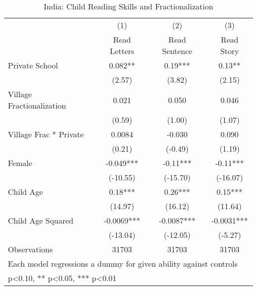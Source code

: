 \begin{table}[htbp]\centering
\def\sym#1{\ifmmode^{#1}\else\(^{#1}\)\fi}
\caption{India: Child Reading Skills and Fractionalization\label{indiareading}}
\begin{tabular}{l*{3}{c}}
\toprule
                &\multicolumn{1}{c}{(1)}&\multicolumn{1}{c}{(2)}&\multicolumn{1}{c}{(3)}\\
                &\multicolumn{1}{c}{Read Letters}&\multicolumn{1}{c}{Read Sentence}&\multicolumn{1}{c}{Read Story}\\
\midrule
Private School  &    0.082** &     0.19***&     0.13** \\
                &   (2.57)   &   (3.82)   &   (2.15)   \\
Village Fractionalization&    0.021   &    0.050   &    0.046   \\
                &   (0.59)   &   (1.00)   &   (1.07)   \\
Village Frac * Private&   0.0084   &   -0.030   &    0.090   \\
                &   (0.21)   &  (-0.49)   &   (1.19)   \\
Female          &   -0.049***&    -0.11***&    -0.11***\\
                & (-10.55)   & (-15.70)   & (-16.07)   \\
Child Age       &     0.18***&     0.26***&     0.15***\\
                &  (14.97)   &  (16.12)   &  (11.64)   \\
Child Age Squared&  -0.0069***&  -0.0087***&  -0.0031***\\
                & (-13.04)   & (-12.05)   &  (-5.27)   \\
\midrule
Observations    &    31703   &    31703   &    31703   \\
\bottomrule
\multicolumn{4}{l}{\footnotesize Each model regressions a dummy for given ability against controls}\\
\multicolumn{4}{l}{\footnotesize * p<0.10, ** p<0.05, *** p<0.01}\\
\end{tabular}
\end{table}

